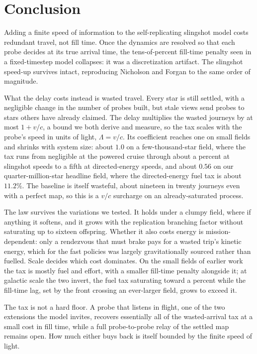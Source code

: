 \section{Conclusion}

Adding a finite speed of information to the self-replicating slingshot model costs redundant
travel, not fill time. Once the dynamics are resolved so that each probe decides at its true
arrival time, the tens-of-percent fill-time penalty seen in a fixed-timestep model collapses: it
was a discretization artifact. The slingshot speed-up survives intact, reproducing Nicholson and
Forgan to the same order of magnitude.

What the delay costs instead is wasted travel. Every star is still settled, with a negligible
change in the number of probes built, but stale views send probes to stars others have already
claimed. The delay multiplies the wasted journeys by at most $1 + v/c$, a bound we both derive and
measure, so the tax scales with the probe's speed in units of light, $\Lambda = v/c$. Its
coefficient reaches one on small fields and shrinks with system size: about $1.0$ on a few-thousand-star field,
where the tax runs from negligible at the powered cruise through about a percent at slingshot
speeds to a fifth at directed-energy speeds, and about $0.56$ on our quarter-million-star
headline field, where the directed-energy fuel tax is about $11.2\%$. The baseline is itself
wasteful, about nineteen in twenty journeys even with a perfect map, so this is a $v/c$ surcharge on an
already-saturated process.

The law survives the variations we tested. It holds under a clumpy field, where if anything it
softens, and it grows with the replication branching factor without saturating up to sixteen
offspring. Whether it also costs energy is mission-dependent: only a rendezvous that must brake
pays for a wasted trip's kinetic energy, which for the fast policies was largely gravitationally
sourced rather than fuelled. Scale decides which cost dominates. On the small fields of earlier
work the tax is mostly fuel and effort, with a smaller fill-time penalty alongside it; at galactic
scale the two invert, the fuel tax saturating toward a percent while the fill-time lag, set by the
front crossing an ever-larger field, grows to exceed it.

The tax is not a hard floor. A probe that listens in flight, one of the two extensions the model
invites, recovers essentially all of the wasted-arrival tax at a small cost in fill time, while a
full probe-to-probe relay of the settled map remains open. How much either buys back is itself
bounded by the finite speed of light.

